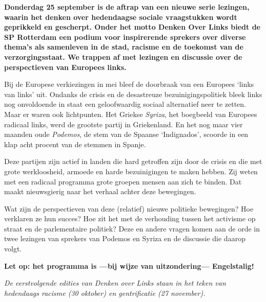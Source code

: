 \documentclass{article}
\begin{document}

\textbf{Donderdag 25 september is de aftrap van een nieuwe serie lezingen, waarin het 
denken over hedendaagse sociale vraagstukken wordt geprikkeld en gescherpt. Onder 
het motto Denken Over Links biedt de SP Rotterdam een podium voor inspirerende 
sprekers over diverse thema's als samenleven in de stad, racisme en de toekomst van 
de verzorgingsstaat. We trappen af met lezingen en discussie over de perspectieven van 
Europees links.}

\vfill

Bij de Europese verkiezingen in mei bleef de doorbraak van een Europees `links
van links' uit. Ondanks de crisis en de desastreuze bezuinigingspolitiek bleek
links nog onvoldoende in staat een geloofwaardig sociaal alternatief neer te
zetten. Maar er waren ook lichtpunten. Het Griekse \emph{Syriza}, het
boegbeeld van Europees radicaal links, werd de grootste partij in Griekenland.
En het nog maar vier maanden oude \emph{Podemos}, de stem van de Spaanse
`Indignados', scoorde in een klap acht procent van de stemmen in Spanje. 

Deze partijen zijn actief in landen die hard getroffen zijn door de crisis en die met grote 
werkloosheid, armoede en harde bezuinigingen te maken hebben. Zij weten met een 
radicaal programma grote groepen mensen aan zich te binden. Dat maakt nieuwsgierig 
naar het verhaal achter deze bewegingen.

Wat zijn de perspectieven van deze (relatief) nieuwe politieke bewegingen? Hoe verklaren 
ze hun succes? Hoe zit het met de verhouding tussen het activisme op straat en de 
parlementaire politiek? Deze en andere vragen komen aan de orde in twee lezingen van 
sprekers van Podemos en Syriza en de discussie die daarop volgt.

\textbf{Let op: het programma is ---bij wijze van uitzondering--- Engelstalig!}

\emph{De eerstvolgende edities van Denken over Links staan in het teken van hedendaags 
racisme (30 oktober) en gentrificatie (27 november).}

\DolFooter

\newpage
\end{document}
